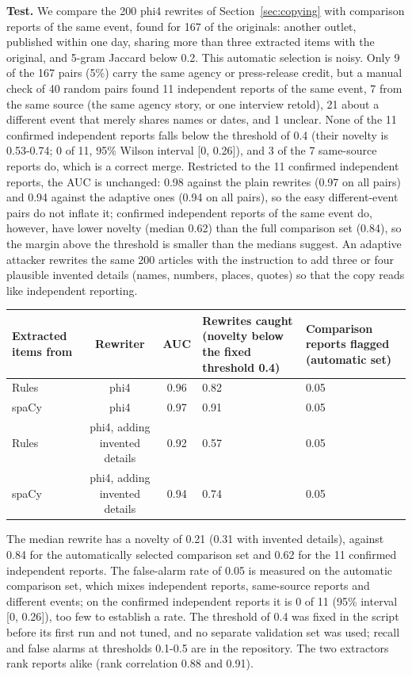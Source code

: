 \textbf{Test.} We compare the 200 phi4 rewrites of Section~\ref{sec:copying} with comparison reports of the same event, found for 167 of the originals: another outlet, published within one day, sharing more than three extracted items with the original, and 5-gram Jaccard below 0.2. This automatic selection is noisy. Only 9 of the 167 pairs (5\%) carry the same agency or press-release credit, but a manual check of 40 random pairs found 11 independent reports of the same event, 7 from the same source (the same agency story, or one interview retold), 21 about a different event that merely shares names or dates, and 1 unclear. None of the 11 confirmed independent reports falls below the threshold of 0.4 (their novelty is 0.53-0.74; 0 of 11, 95\% Wilson interval {[}0, 0.26{]}), and 3 of the 7 same-source reports do, which is a correct merge. Restricted to the 11 confirmed independent reports, the AUC is unchanged: 0.98 against the plain rewrites (0.97 on all pairs) and 0.94 against the adaptive ones (0.94 on all pairs), so the easy different-event pairs do not inflate it; confirmed independent reports of the same event do, however, have lower novelty (median 0.62) than the full comparison set (0.84), so the margin above the threshold is smaller than the medians suggest. An adaptive attacker rewrites the same 200 articles with the instruction to add three or four plausible invented details (names, numbers, places, quotes) so that the copy reads like independent reporting.

\begin{table}[htbp]\centering\footnotesize
\begin{tabularx}{\linewidth}{lccZZ}
\toprule
Extracted items from & Rewriter & AUC & Rewrites caught (novelty below the fixed threshold 0.4) & Comparison reports flagged (automatic set) \\
\midrule
Rules & phi4 & 0.96 & 0.82 & 0.05 \\
spaCy & phi4 & 0.97 & 0.91 & 0.05 \\
Rules & phi4, adding invented details & 0.92 & 0.57 & 0.05 \\
spaCy & phi4, adding invented details & 0.94 & 0.74 & 0.05 \\
\bottomrule
\end{tabularx}
\end{table}

The median rewrite has a novelty of 0.21 (0.31 with invented details), against 0.84 for the automatically selected comparison set and 0.62 for the 11 confirmed independent reports. The false-alarm rate of 0.05 is measured on the automatic comparison set, which mixes independent reports, same-source reports and different events; on the confirmed independent reports it is 0 of 11 (95\% interval {[}0, 0.26{]}), too few to establish a rate. The threshold of 0.4 was fixed in the script before its first run and not tuned, and no separate validation set was used; recall and false alarms at thresholds 0.1-0.5 are in the repository. The two extractors rank reports alike (rank correlation 0.88 and 0.91).

